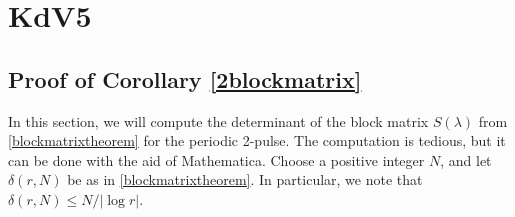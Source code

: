 \documentclass[thesis.tex]{subfiles}
\begin{document}
\iffulldocument\else
	\chapter{KdV5}
\fi

\section{Proof of Corollary \ref{2blockmatrix}}

In this section, we will compute the determinant of the block matrix $S(\lambda)$ from \cref{blockmatrixtheorem} for the periodic 2-pulse. The computation is tedious, but it can be done with the aid of Mathematica. Choose a positive integer $N$, and let $\delta(r, N)$ be as in \cref{blockmatrixtheorem}. In particular, we note that $\delta(r,N) \leq N/|\log r|$. 
\end{document}
